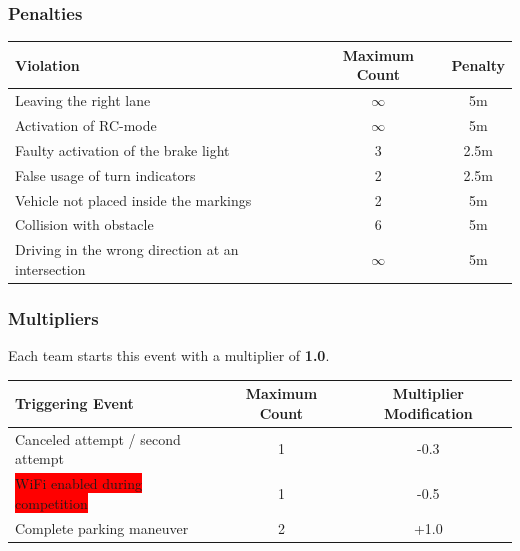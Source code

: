 \documentclass[a4paper]{report}
\begin{document}
\subsubsection{Penalties}
\label{freedrive_penalties}

\begin{table}[H]
	\begin{tabular}{@{}lcc@{}}
		\toprule
		\textbf{Violation}                                & \textbf{Maximum Count} & \textbf{Penalty} \\ \midrule
		Leaving the right lane                            & $\infty$               & 5m               \\
		Activation of RC-mode                             & $\infty$               & 5m               \\
		Faulty activation of the brake light              & 3                      & 2.5m             \\
		False usage of turn indicators                    & 2                      & 2.5m             \\
		Vehicle not placed inside the markings            & 2                      & 5m               \\
		Collision with obstacle                           & 6                      & 5m               \\
		Driving in the wrong direction at an intersection & $\infty$               & 5m               \\
		\bottomrule
	\end{tabular}
\end{table}

\subsubsection{Multipliers}
\label{freedrive_multipliers}

Each team starts this event with a multiplier of \textbf{1.0}.

\begin{table}[H]
	\begin{tabular}{@{}lcc@{}}
		\toprule
		\textbf{Triggering Event}                       & \textbf{Maximum Count} & \textbf{Multiplier Modification} \\ \midrule
		Canceled attempt / second attempt               & 1                      & -0.3                             \\
		\colorbox{red}{WiFi enabled during competition} & 1                      & -0.5                             \\
		Complete parking maneuver                       & 2                      & +1.0                             \\
		\bottomrule
	\end{tabular}
\end{table}
\end{document}
